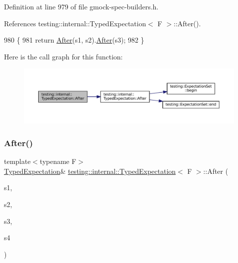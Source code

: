 Definition at line 979 of file gmock-\/spec-\/builders.\+h.



References testing\+::internal\+::\+Typed\+Expectation$<$ F $>$\+::\+After().


\begin{DoxyCode}
980                                                     \{
981     \textcolor{keywordflow}{return} \hyperlink{classtesting_1_1internal_1_1TypedExpectation_a30f320d18ebf1a40e94883d7a56c6c8c}{After}(s1, s2).\hyperlink{classtesting_1_1internal_1_1TypedExpectation_a30f320d18ebf1a40e94883d7a56c6c8c}{After}(s3);
982   \}
\end{DoxyCode}
Here is the call graph for this function\+:
\nopagebreak
\begin{figure}[H]
\begin{center}
\leavevmode
\includegraphics[width=350pt]{classtesting_1_1internal_1_1TypedExpectation_a95a341dd221901b5e51dd7cfdbdb3570_cgraph}
\end{center}
\end{figure}
\mbox{\label{classtesting_1_1internal_1_1TypedExpectation_a1749e368f659352ed8375512acafc178}} 
\subsubsection{\texorpdfstring{After()}{After()}\hspace{0.1cm}{\footnotesize\ttfamily [4/5]}}
{\footnotesize\ttfamily template$<$typename F$>$ \\
\hyperlink{classtesting_1_1internal_1_1TypedExpectation}{Typed\+Expectation}\& \hyperlink{classtesting_1_1internal_1_1TypedExpectation}{testing\+::internal\+::\+Typed\+Expectation}$<$ F $>$\+::After (\begin{DoxyParamCaption}\item[{const \hyperlink{classtesting_1_1ExpectationSet}{Expectation\+Set} \&}]{s1,  }\item[{const \hyperlink{classtesting_1_1ExpectationSet}{Expectation\+Set} \&}]{s2,  }\item[{const \hyperlink{classtesting_1_1ExpectationSet}{Expectation\+Set} \&}]{s3,  }\item[{const \hyperlink{classtesting_1_1ExpectationSet}{Expectation\+Set} \&}]{s4 }\end{DoxyParamCaption})\hspace{0.3cm}{\ttfamily [inline]}}



